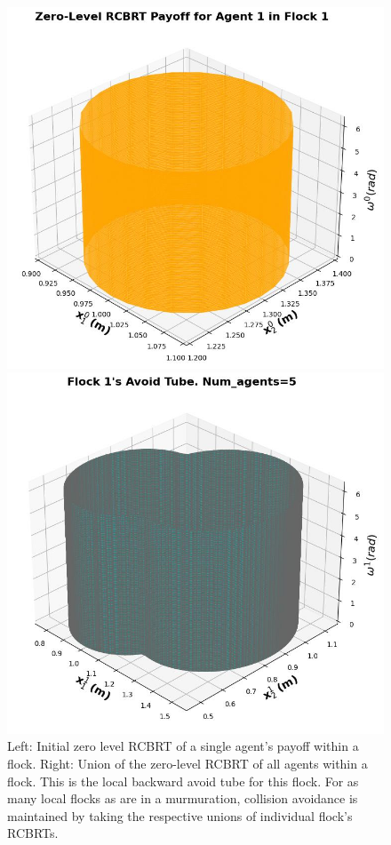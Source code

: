 \begin{figure}[tb!]
	\centering
	\begin{minipage}[b]{.45\textwidth}
		\includegraphics[width=1.0\textwidth, height=1.0\textwidth]{figures/payoff_single.jpg}
	\end{minipage}
	\begin{minipage}[b]{.45\textwidth}
		\includegraphics[width=1.0\textwidth, height=1.0\textwidth]{figures/flock_1.jpg}
	\end{minipage}
	\footnotesize{\caption{Left: Initial zero level RCBRT of a single agent's payoff within a flock. Right: Union of the zero-level RCBRT of all agents within a flock. This is the local backward avoid tube for this flock. For as many local flocks as are in a murmuration, collision avoidance is maintained by taking the respective unions of individual flock's RCBRTs.}}
	\label{fig:starlings}
\end{figure}
